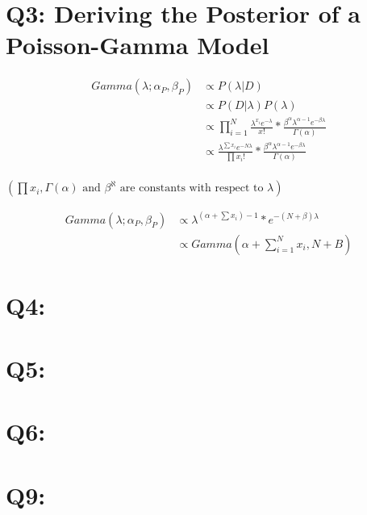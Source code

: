 \documentclass{article}
\begin{document}
    \section*{Q3: Deriving the Posterior of a Poisson-Gamma Model}

        \begin{align*}
            Gamma(\lambda;\alpha_P, \beta_P) &\propto P(\lambda|D)\\
            &\propto P(D|\lambda)P(\lambda)\\
            &\propto \prod^N_{i=1}\frac{\lambda^{x_i}e^{-\lambda}}{x!} * \frac{\beta^\alpha\lambda^{\alpha-1}e^{-\beta\lambda}}{\Gamma(\alpha)}\\
            &\propto \frac{\lambda^{\sum x_i} e^{-N\lambda}}{\prod x_i!}*\frac{\beta^\alpha\lambda^{\alpha-1}e^{-\beta\lambda}}{\Gamma(\alpha)}\\
        \end{align*}
        \begin{center}$\left(\prod x_i, \Gamma(\alpha) \text{ and } \beta^\aleph \text{ are constants with respect to } \lambda\right)$\end{center}
        \begin{align*}
            Gamma(\lambda;\alpha_P, \beta_P) &\propto \lambda^{\left(\alpha + \sum x_i\right) - 1}*e^{-(N+\beta)\lambda}\\
            &\propto Gamma\left(\alpha + \sum_{i=1}^N x_i , N+B\right)
        \end{align*}
            
    \section*{Q4:}
        
    \section*{Q5:}

    \section*{Q6:}

    \section*{Q9:}
\end{document}
